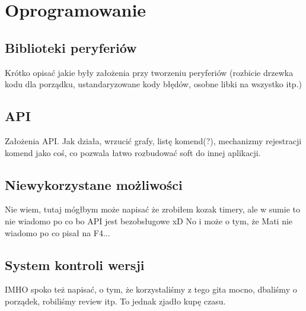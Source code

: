 \section{Oprogramowanie}
\subsection{Biblioteki peryferiów}
Krótko opisać jakie były założenia przy tworzeniu peryferiów (rozbicie drzewka kodu dla porządku, ustandaryzowane kody błędów, osobne libki na wszystko itp.)
\subsection{API}
Założenia API. Jak działa, wrzucić grafy, listę komend(?), mechanizmy rejestracji komend jako coś, co pozwala łatwo rozbudować soft do innej aplikacji.

\subsection{Niewykorzystane możliwości}
Nie wiem, tutaj mógłbym może napisać że zrobiłem kozak timery, ale w sumie to nie wiadomo po co bo API jest bezobsługowe xD No i może o tym, że Mati nie wiadomo po co pisał na F4...

\subsection{System kontroli wersji}
IMHO spoko też napisać, o tym, że korzystaliśmy z tego gita mocno, dbaliśmy o porządek, robiliśmy review itp. To jednak zjadło kupę czasu.
